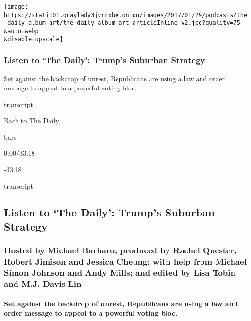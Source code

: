 \texttt{[image: https://static01.graylady3jvrrxbe.onion/images/2017/01/29/podcasts/the-daily-album-art/the-daily-album-art-articleInline-v2.jpg?quality=75\\\&auto=webp\\\&disable=upscale]}

\hypertarget{listen-to-the-daily-trumps-suburban-strategy}{%
\subsubsection{Listen to `The Daily': Trump's Suburban
Strategy}\label{listen-to-the-daily-trumps-suburban-strategy}}

Set against the backdrop of unrest, Republicans are using a law and
order message to appeal to a powerful voting bloc.

transcript

Back to The Daily

bars

0:00/33:18

-33:18

transcript

\hypertarget{listen-to-the-daily-trumps-suburban-strategy-1}{%
\subsection{Listen to `The Daily': Trump's Suburban
Strategy}\label{listen-to-the-daily-trumps-suburban-strategy-1}}

\hypertarget{hosted-by-michael-barbaro-produced-by-rachel-quester-robert-jimison-and-jessica-cheung-with-help-from-michael-simon-johnson-and-andy-mills-and-edited-by-lisa-tobin-and-mj-davis-lin}{%
\subsubsection{Hosted by Michael Barbaro; produced by Rachel Quester,
Robert Jimison and Jessica Cheung; with help from Michael Simon Johnson
and Andy Mills; and edited by Lisa Tobin and M.J. Davis
Lin}\label{hosted-by-michael-barbaro-produced-by-rachel-quester-robert-jimison-and-jessica-cheung-with-help-from-michael-simon-johnson-and-andy-mills-and-edited-by-lisa-tobin-and-mj-davis-lin}}

\hypertarget{set-against-the-backdrop-of-unrest-republicans-are-using-a-law-and-order-message-to-appeal-to-a-powerful-voting-bloc}{%
\paragraph{Set against the backdrop of unrest, Republicans are using a
law and order message to appeal to a powerful voting
bloc.}\label{set-against-the-backdrop-of-unrest-republicans-are-using-a-law-and-order-message-to-appeal-to-a-powerful-voting-bloc}}

